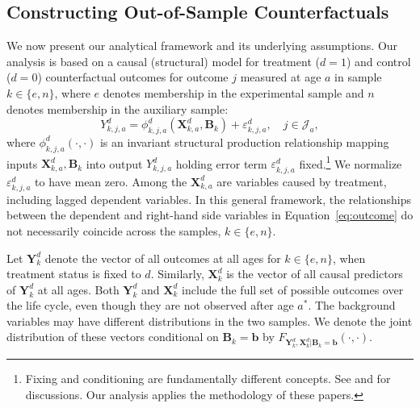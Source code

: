 \subsection{Constructing Out-of-Sample Counterfactuals}\label{section:just}

We now present our analytical framework and its underlying assumptions. Our analysis is based on a causal (structural) model for treatment ($d=1$) and control ($d=0$) counterfactual outcomes for outcome $j$ measured at age $a$ in sample $k \in \{e,n\}$, where $e$ denotes membership in the experimental sample and $n$ denotes membership in the auxiliary sample:
\begin{equation}\label{eq:outcome}
Y^d_{k,j,a} = \phi^d_{k,j,a} (\bm{X}^d_{k,a}, \bm{B}_k) + \varepsilon^d_{k,j,a}, \quad j \in \mathcal{J}_a,
\end{equation}
where $\phi^d_{k,j,a}\left( \cdot, \cdot \right)$ is an invariant structural production relationship mapping inputs $\bm{X}^d_{k,a}, \bm{B}_k$ into output $Y^d_{k,j,a}$ holding error term $\varepsilon^d_{k,j,a}$ fixed.\footnote{Fixing and conditioning are fundamentally different concepts. See \cite{Haavelmo_1943_Econometrica} and \citet{Heckman_Pinto_2015_EconometTheory} for discussions. Our analysis applies the methodology of these papers.} We normalize $\varepsilon^d_{k,j,a}$ to have mean zero. Among the $\bm{X}^d_{k,a}$ are variables caused by treatment, including lagged dependent variables. In this general framework, the relationships between the dependent and right-hand side variables in Equation~\eqref{eq:outcome} do not necessarily coincide across the samples, $k \in \{e,n\}$.

Let $\bm{Y}_k^d$ denote the vector of all outcomes at all ages for $k \in \{e, n \}$, when treatment status is fixed to $d$. Similarly, $\bm{X}_k^d$ is the vector of all causal predictors of $\bm{Y}_k^d$ at all ages. Both $\bm{Y}_k^d$ and $\bm{X}_k^d$ include the full set of possible outcomes over the life cycle, even though they are not observed after age $a^*$. The background variables may have different distributions in the two samples. We denote the joint distribution of these vectors conditional on $\bm{B}_k = \bm{b}$ by $F_{\bm{Y}_k^d, \bm{X}_k^d | \bm{B}_k = \bm{b}}(\cdot,\cdot)$.

